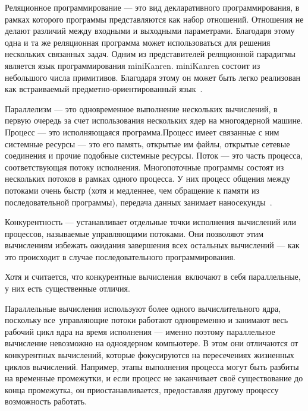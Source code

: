 

Реляционное программирование --- это вид декларативного программирования, в рамках которого программы представляются как набор
отношений. Отношения не делают различий между входными и выходными параметрами. Благодаря этому одна и та же реляционная
программа может использоваться для решения нескольких связанных
задач. Одним из представителей реляционной парадигмы является
язык программирования miniKanren. miniKanren состоит из небольшого числа примитивов. Благодаря этому он может быть легко реализован как встраиваемый предметно-ориентированный язык~\cite{moiseenko_podkopaev}. 


Параллелизм --- это одновременное выполнение нескольких вычислений, в первую очередь за счет использования нескольких ядер на многоядерной машине.  
Процесс --- это исполняющаяся программа.Процесс имеет связанные с ним системные ресурсы --- это его память, открытые им файлы, открытые сетевые соединения и прочие подобные системные ресурсы.
Поток --- это часть процесса, соответствующая потоку исполнения.
Многопоточные программы состоят из нескольких потоков в рамках одного процесса. 
У них процесс общения между потоками очень быстр 
(хотя и медленнее, чем обращение к памяти из последовательной программы), 
передача данных занимает наносекунды~\cite{parallel}. 

Конкурентность ---  устанавливает 
отдельные точки исполнения вычислений или процессов, 
называемые управляющими потоками. Они позволяют этим вычислениям избежать ожидания завершения всех 
остальных вычислений --- как это происходит в случае последовательного программирования.

Хотя и считается, что конкурентные вычисления включают в себя параллельные, у них есть существенные отличия.

Параллельные вычисления используют более одного вычислительного ядра, поскольку все управляющие потоки работают одновременно и 
занимают весь рабочий цикл ядра на время исполнения — именно поэтому параллельное вычисление невозможно на одноядерном компьютере. 
В этом они отличаются от конкурентных вычислений, которые фокусируются на пересечениях жизненных циклов вычислений. 
Например, этапы выполнения процесса могут быть разбиты на временные промежутки, и если процесс не заканчивает своё существование 
до конца промежутка, он приостанавливается, предоставляя другому процессу возможность работать.

